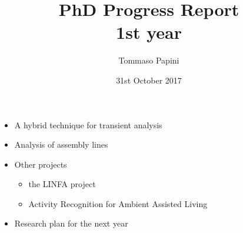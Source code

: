 
\title[PhD Progress Report: 1st year]{
  PhD Progress Report\\
  1st year
}
\author{
  Tommaso Papini
}
\date{
  31st October 2017
}
  
\begin{frame}
  \titlepage
  
  \begin{itemize}
    \item A hybrid technique for transient analysis
    \item Analysis of assembly lines
    \item Other projects
    \begin{itemize}
      \item the LINFA project
      \item Activity Recognition for Ambient Assisted Living
    \end{itemize}
    \item Research plan for the next year
  \end{itemize}
\end{frame}